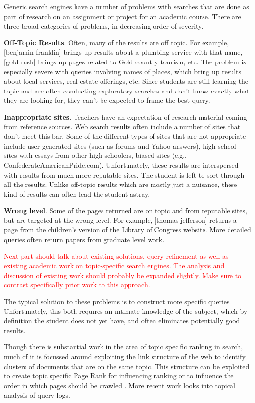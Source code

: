 \documentclass{acm_proc_article-sp}
\begin{document}
Generic search engines have a number of problems with searches that are done as
part of research on an assignment or project for an academic course. There are
three broad categories of problems, in decreasing order of severity. 

{\bf Off-Topic Results}. Often, many of the results are off topic. For example,
[benjamin franklin] brings up results about a plumbing service with that name,
[gold rush] brings up pages related to Gold country tourism, etc. The problem is
especially severe with queries involving names of places, which bring up results
about local services, real estate offerings, etc. Since students are still
learning the topic and are often conducting exploratory searches and don't know
exactly what they are looking for, they can't be expected to frame the best
query. 

{\bf Inappropriate sites}. Teachers have an expectation of research material
coming from reference sources. Web search results often include a number of
sites that don't meet this bar. Some of the different types of sites that are
not appropriate include user generated sites (such as forums and Yahoo answers),
high school sites with essays from other high schoolers, biased sites (e.g.,
ConfederateAmericanPride.com). Unfortunately, these results are interspersed
with results from much more reputable sites. The student is left to sort through
all the results. Unlike off-topic results which are mostly just a nuisance,
these kind of results can often lead the student astray. 

{\bf Wrong level}. Some of the pages returned are on topic and from reputable
sites, but are targeted at the wrong level. For example, [thomas jefferson]
returns a page from the children's version of the Library of Congress
website. More detailed queries often return papers from graduate level work. 

\textcolor{red}{Next part should talk about existing solutions, query refinement as
  well as existing academic work on topic-specific search engines. The analysis
  and discussion of existing work should probably be expanded slightly. Make
  sure to contrast specifically prior work to this approach.}

The typical solution to these problems is to construct more specific
queries. Unfortunately, this both requires an intimate knowledge of the subject,
which by definition the student does not yet have, and often eliminates
potentially good results. 

Though there is substantial work in the area of topic specific ranking in
search, much of it is focussed around exploiting the link structure of the web
to identify clusters of documents that are on the same topic. This structure
can be exploited to create topic specific Page Rank \cite{haveliwala2003topic}
for influencing ranking or to influence the order in which pages should be
crawled \cite{hsu2006topic,buntine2004scalable}. More recent work
\cite{bar2009topic} looks into topical analysis of query logs.  
\end{document}
